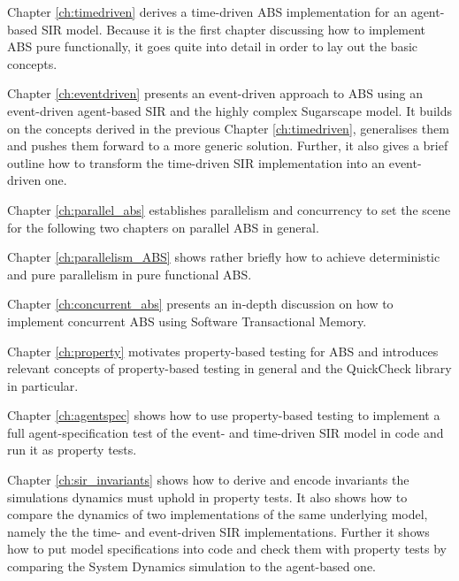 \medskip

Chapter \ref{ch:timedriven} derives a time-driven ABS implementation for an agent-based SIR model. Because it is the first chapter discussing how to implement ABS pure functionally, it goes quite into detail in order to lay out the basic concepts.

\medskip

Chapter \ref{ch:eventdriven} presents an event-driven approach to ABS using an event-driven agent-based SIR and the highly complex Sugarscape model. It builds on the concepts derived in the previous Chapter \ref{ch:timedriven}, generalises them and pushes them forward to a more generic solution. Further, it also gives a brief outline how to transform the time-driven SIR implementation into an event-driven one.

\medskip

Chapter \ref{ch:parallel_abs} establishes parallelism and concurrency to set the scene for the following two chapters on parallel ABS in general.

\medskip

Chapter \ref{ch:parallelism_ABS} shows rather briefly how to achieve deterministic and pure parallelism in pure functional ABS. 

\medskip

Chapter \ref{ch:concurrent_abs} presents an in-depth discussion on how to implement concurrent ABS using Software Transactional Memory.

\medskip

Chapter \ref{ch:property} motivates property-based testing for ABS and introduces relevant concepts of property-based testing in general and the QuickCheck library in particular. 

\medskip

Chapter \ref{ch:agentspec} shows how to use property-based testing to implement a full agent-specification test of the event- and time-driven SIR model in code and run it as property tests.

\medskip

Chapter \ref{ch:sir_invariants} shows how to derive and encode invariants the simulations dynamics must uphold in property tests. It also shows how to compare the dynamics of two implementations of the same underlying model, namely the the time- and event-driven SIR implementations. Further it shows how to put model specifications into code and check them with property tests by comparing the System Dynamics simulation to the agent-based one.

